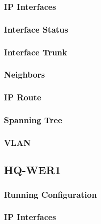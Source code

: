 \subsubsection{IP Interfaces}


\subsubsection{Interface Status}


\subsubsection{Interface Trunk}


\subsubsection{Neighbors}


\subsubsection{IP Route}


\subsubsection{Spanning Tree}


\subsubsection{VLAN}





\subsection{HQ-WER1}
\subsubsection{Running Configuration}


\subsubsection{IP Interfaces}


